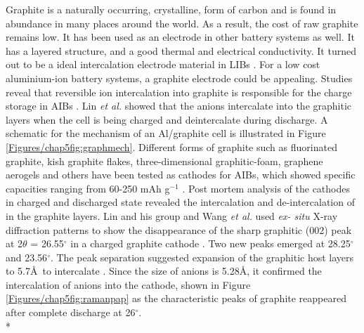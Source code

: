 Graphite is a naturally occurring, crystalline, form of carbon and is found in abundance in many places around the world. As a result, the cost of raw graphite remains low. It has been used as an electrode in other battery systems as well. It has a layered structure, and a good thermal and electrical conductivity. It turned out to be a ideal intercalation electrode material in LIBs \cite{ji_recent_2011, yoo_large_2008, lian_large_2010}. For a low cost aluminium-ion battery systems, a graphite electrode could be appealing. Studies reveal that reversible ion intercalation into graphite is responsible for the charge storage in AIBs \cite{rani_fluorinated_2013, lin_ultrafast_2015}. Lin \textit{et al.} showed that the  anions intercalate into the graphitic layers when the cell is being charged and deintercalate during discharge. A schematic for the mechanism of an Al/graphite cell is illustrated in Figure \ref{Figures/chap5fig:graphmech}. Different forms of graphite such as fluorinated graphite, kish graphite flakes, three-dimensional graphitic-foam, graphene aerogels and others have been tested as cathodes for AIBs, which showed specific capacities ranging from 60-250 mAh g$^{-1}$ \cite{rani_fluorinated_2013, wang_kish_2017, wu_3d_2016, huang_graphene_2019}. Post mortem analysis of the cathodes in charged and discharged state revealed the intercalation and de-intercalation of  in the graphite layers. Lin and his group and Wang \textit{et al.} used \textit{ex- situ} X-ray diffraction patterns to show the disappearance of the sharp graphitic (002) peak at 2$\theta$ = 26.55$^{\circ}$ in a charged graphite cathode \cite{lin_ultrafast_2015, wang_kish_2017}. Two new peaks emerged at 28.25$^{\circ}$ and 23.56$^{\circ}$. The peak separation suggested expansion of the graphitic host layers to 5.7\AA\ to intercalate . Since the size of  anions is 5.28\AA, it confirmed the intercalation of  anions into the cathode, shown in Figure \ref{Figures/chap5fig:ramanpap} as the characteristic peaks of graphite reappeared after complete discharge at 26$^{\circ}$. \\*

